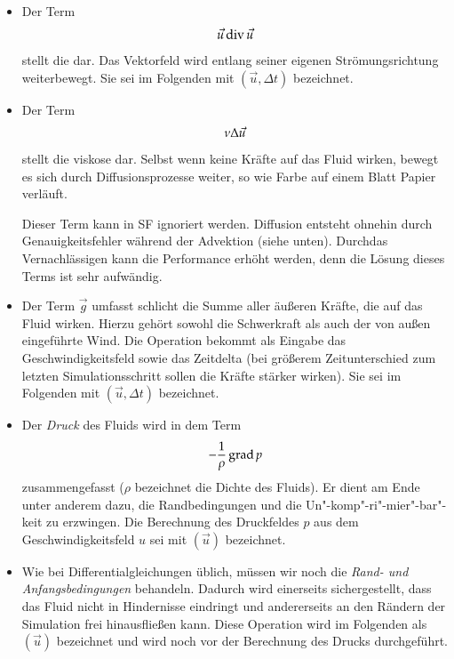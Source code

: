 \begin{itemize}
\item
	Der Term
	\begin{equation}
	\vec{u} \operatorname*{div} \vec{u}
	\end{equation}
	stellt die  dar. Das Vektorfeld wird entlang
	seiner eigenen Strömungsrichtung weiterbewegt. Sie sei im Folgenden mit
	$(\vec{u},\Delta t)$ bezeichnet.
\item
	Der Term
	\begin{equation}
	\nu \Delta \vec{u}
	\end{equation}
	stellt die viskose  dar. Selbst wenn keine
	Kräfte auf das Fluid wirken, bewegt es sich durch Diffusionsprozesse
	weiter, so wie Farbe auf einem Blatt Papier verläuft.

	Dieser Term kann in SF ignoriert werden. Diffusion entsteht
	ohnehin  durch Genauigkeitsfehler während der
	Advektion (siehe unten). Durchdas Vernachlässigen kann die
Performance erhöht werden, denn die Lösung dieses Terms ist sehr
aufwändig.
\item
	Der Term $\vec{g}$ umfasst schlicht die Summe aller äußeren
	Kräfte, die auf das Fluid wirken. Hierzu gehört sowohl die Schwerkraft
	als auch der von außen eingeführte Wind. Die Operation bekommt als
	Eingabe das Geschwindigkeitsfeld sowie das Zeitdelta (bei größerem
	Zeitunterschied zum letzten Simulationsschritt sollen die Kräfte
	stärker wirken). Sie sei im Folgenden mit
	$(\vec{u},\Delta t)$ bezeichnet.
\item
	Der \emph{Druck} des Fluids wird in dem Term
	\begin{equation}
	-\frac{1}{\rho} \operatorname*{grad} p
	\end{equation}
	zusammengefasst ($\rho$ bezeichnet die Dichte des Fluids). Er
        dient am Ende unter anderem dazu, die Randbedingungen und die
        Un"-komp"-ri"-mier"-bar"-keit zu erzwingen. Die Berechnung des
        Druckfeldes $p$ aus dem Geschwindigkeitsfeld $u$ sei mit
        $(\vec{u})$ bezeichnet.
\item
	Wie bei Differentialgleichungen üblich, müssen wir noch die
	\emph{Rand- und Anfangsbedingungen} behandeln. Dadurch wird
	einerseits sichergestellt, dass das Fluid nicht in Hindernisse
	eindringt und andererseits an den Rändern der Simulation frei hinausfließen
	kann. Diese Operation wird im Folgenden als
	$(\vec{u})$ bezeichnet und wird noch vor der
	Berechnung des Drucks durchgeführt.
\end{itemize}

